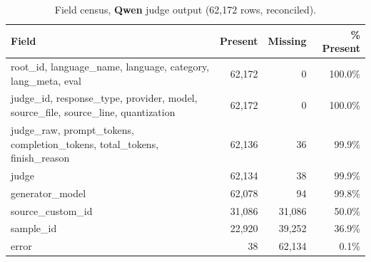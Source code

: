 \begin{table}[t]
\centering
\small
\caption{Field census, \textbf{Qwen} judge output (62{,}172 rows, reconciled).}
\label{tab:field_census_qwen}
\begin{tabular}{lrrr}
\toprule
\textbf{Field} & \textbf{Present} & \textbf{Missing} & \textbf{\% Present} \\
\midrule
root\_id, language\_name, language, category, lang\_meta, eval & 62{,}172 & 0 & 100.0\% \\
judge\_id, response\_type, provider, model, source\_file, source\_line, quantization & 62{,}172 & 0 & 100.0\% \\
judge\_raw, prompt\_tokens, completion\_tokens, total\_tokens, finish\_reason & 62{,}136 & 36 & 99.9\% \\
judge & 62{,}134 & 38 & 99.9\% \\
generator\_model & 62{,}078 & 94 & 99.8\% \\
source\_custom\_id & 31{,}086 & 31{,}086 & 50.0\% \\
sample\_id & 22{,}920 & 39{,}252 & 36.9\% \\
error & 38 & 62{,}134 & 0.1\% \\
\bottomrule
\end{tabular}
\end{table}

